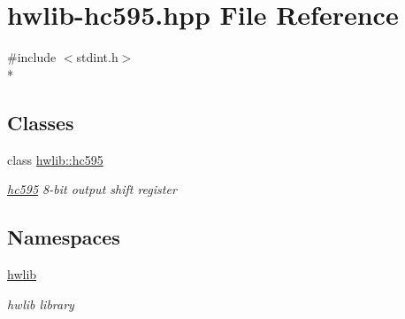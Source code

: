 \hypertarget{hwlib-hc595_8hpp}{}\section{hwlib-\/hc595.hpp File Reference}
\label{hwlib-hc595_8hpp}
{\ttfamily \#include $<$stdint.\+h$>$}\\*
\subsection*{Classes}
\begin{DoxyCompactItemize}
\item 
class \hyperlink{classhwlib_1_1hc595}{hwlib\+::hc595}
\begin{DoxyCompactList}\small\item\em \hyperlink{classhwlib_1_1hc595}{hc595} 8-\/bit output shift register \end{DoxyCompactList}\end{DoxyCompactItemize}
\subsection*{Namespaces}
\begin{DoxyCompactItemize}
\item 
 \hyperlink{namespacehwlib}{hwlib}
\begin{DoxyCompactList}\small\item\em hwlib library \end{DoxyCompactList}\end{DoxyCompactItemize}
